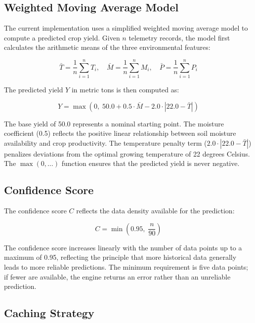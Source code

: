 \subsection{Weighted Moving Average Model}

The current implementation uses a simplified weighted moving average model to compute a predicted crop yield. Given $n$ telemetry records, the model first calculates the arithmetic means of the three environmental features:

\begin{equation}
\bar{T} = \frac{1}{n} \sum_{i=1}^{n} T_i, \quad
\bar{M} = \frac{1}{n} \sum_{i=1}^{n} M_i, \quad
\bar{P} = \frac{1}{n} \sum_{i=1}^{n} P_i
\label{eq:averages}
\end{equation}

The predicted yield $Y$ in metric tons is then computed as:

\begin{equation}
Y = \max\left(0, \; 50.0 + 0.5 \cdot \bar{M} - 2.0 \cdot |22.0 - \bar{T}|\right)
\label{eq:yield}
\end{equation}

The base yield of 50.0 represents a nominal starting point. The moisture coefficient (0.5) reflects the positive linear relationship between soil moisture availability and crop productivity. The temperature penalty term ($2.0 \cdot |22.0 - \bar{T}|$) penalizes deviations from the optimal growing temperature of 22 degrees Celsius. The $\max(0, \ldots)$ function ensures that the predicted yield is never negative.

\subsection{Confidence Score}

The confidence score $C$ reflects the data density available for the prediction:

\begin{equation}
C = \min\left(0.95, \; \frac{n}{90}\right)
\label{eq:confidence}
\end{equation}

The confidence score increases linearly with the number of data points up to a maximum of 0.95, reflecting the principle that more historical data generally leads to more reliable predictions. The minimum requirement is five data points; if fewer are available, the engine returns an error rather than an unreliable prediction.

\subsection{Caching Strategy}


